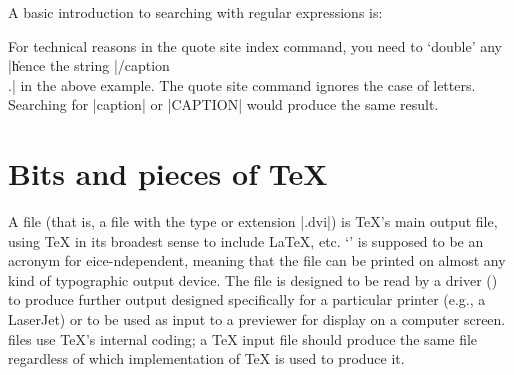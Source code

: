 A basic introduction to searching with regular expressions is:

For technical reasons in the quote site index command, you need to
`double' any |\| hence the string |/caption\\.| in the above example.
The quote site command ignores the case of letters.  Searching for
|caption| or |CAPTION| would produce the same result.

\section{Bits and pieces of \TeX{}}


A  file (that is, a file with the type or extension |.dvi|) is
\TeX{}'s main output file, using \TeX{} in its broadest sense to
include \LaTeX{}, etc.  `' is supposed to be an acronym for
eice-ndependent, meaning that the file can be
printed on almost any
kind of typographic output device.  The  file is designed to be
read by a driver () to produce
further output designed specifically for a particular printer (e.g., a
LaserJet) or to be used as input to a previewer for display on a
computer screen.   files use \TeX{}'s internal coding; a \TeX{}
input file should produce the same  file regardless of which
implementation of \TeX{} is used to produce it.

